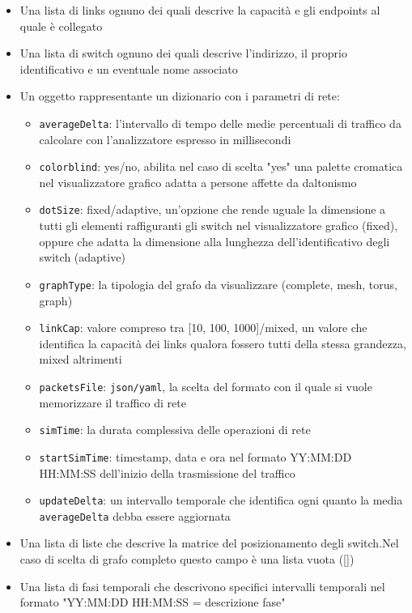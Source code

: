 \documentclass[binding=0.6cm]{sapthesis}
\begin{document}
\begin{itemize}
    \item Una lista di links ognuno dei quali descrive la capacità e gli endpoints al quale è collegato
    \item Una lista di switch ognuno dei quali descrive l'indirizzo, il proprio identificativo e un eventuale nome associato
    \item Un oggetto rappresentante un dizionario con i parametri di rete:
    \begin{itemize}
        \item \texttt{averageDelta}: l'intervallo di tempo delle medie percentuali di traffico da calcolare con l'analizzatore espresso in millisecondi
        \item \texttt{colorblind}: yes/no, abilita nel caso di scelta "yes" una palette cromatica nel visualizzatore grafico adatta a persone affette da daltonismo
        \item \texttt{dotSize}: fixed/adaptive, un'opzione che rende uguale la dimensione a tutti gli elementi raffiguranti gli switch nel visualizzatore grafico (fixed), oppure che adatta la dimensione alla lunghezza dell'identificativo degli switch (adaptive)
        \item \texttt{graphType}: la tipologia del grafo da visualizzare (complete, mesh, torus, graph)
        \item \texttt{linkCap}: valore compreso tra [10, 100, 1000]/mixed, un valore che identifica la capacità dei links qualora fossero tutti della stessa grandezza, mixed altrimenti
        \item \texttt{packetsFile}: \texttt{json}\texttt{/yaml}, la scelta del formato con il quale si vuole memorizzare il traffico di rete
        \item \texttt{simTime}: la durata complessiva delle operazioni di rete
        \item \texttt{startSimTime}: timestamp, data e ora nel formato YY:MM:DD HH:MM:SS dell'inizio della trasmissione del traffico
        \item \texttt{updateDelta}: un intervallo temporale che identifica ogni quanto la media \texttt{averageDelta} debba essere aggiornata
    \end{itemize}
    \item Una lista di liste che descrive la matrice del posizionamento degli switch.Nel caso di scelta di grafo completo questo campo è una lista vuota ([])
    \item Una lista di fasi temporali che descrivono specifici intervalli temporali nel formato "YY:MM:DD HH:MM:SS = descrizione fase"
\end{itemize}
\end{document}
